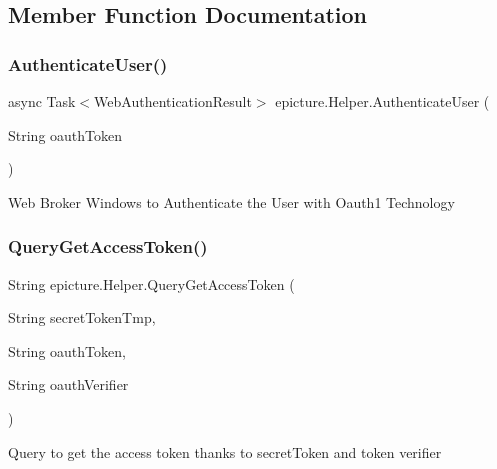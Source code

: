 \subsection{Member Function Documentation}
\mbox{\label{classepicture_1_1_helper_af18b551f1629ecc0e6d8cacf1e9a4770}} 
\subsubsection{\texorpdfstring{Authenticate\+User()}{AuthenticateUser()}}
{\footnotesize\ttfamily async Task$<$Web\+Authentication\+Result$>$ epicture.\+Helper.\+Authenticate\+User (\begin{DoxyParamCaption}\item[{String}]{oauth\+Token }\end{DoxyParamCaption})}

Web Broker Windows to Authenticate the User with Oauth1 Technology \mbox{\label{classepicture_1_1_helper_a82fe7fbebbb5cee5e7787d5f7062bb5f}} 
\subsubsection{\texorpdfstring{Query\+Get\+Access\+Token()}{QueryGetAccessToken()}}
{\footnotesize\ttfamily String epicture.\+Helper.\+Query\+Get\+Access\+Token (\begin{DoxyParamCaption}\item[{String}]{secret\+Token\+Tmp,  }\item[{String}]{oauth\+Token,  }\item[{String}]{oauth\+Verifier }\end{DoxyParamCaption})}

Query to get the access token thanks to secret\+Token and token verifier \mbox{\label{classepicture_1_1_helper_a9a42fa4d53acaed05f4985c8b2804417}} 

